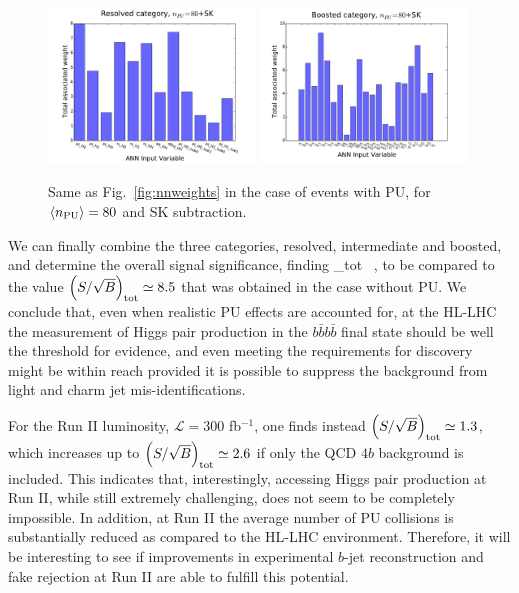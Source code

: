\begin{figure}[t]
\begin{center}
\includegraphics[width=0.49\textwidth]{plots/res_wgthist_SKPU80.pdf}
\includegraphics[width=0.49\textwidth]{plots/bst_wgthist_SKPU80.pdf}
\vspace{-0.5cm}
\caption{\small
Same as Fig.~\ref{fig:nnweights} in the
case of events with PU, for
 $\left\langle n_{\rm PU}\right\rangle=80$ 
  and SK subtraction.
}
\label{fig:nnweights_PU}
\end{center}
\end{figure}

We can finally combine the three categories, resolved,
intermediate and boosted, and determine the overall signal
significance, finding
\be
\lp {}\rp_{\rm tot}  \, ,
\ee
to be compared to the value $\left( S/\sqrt{B}\right)_{\rm tot} \simeq 8.5$
that was obtained in the case without PU.
%
We conclude that, even when realistic PU effects are accounted
for, at the HL-LHC the measurement of
Higgs pair production in the $b\bar{b}b\bar{b}$ final state should be 
well the threshold for evidence, and even meeting the
requirements for discovery might be within reach provided it is possible
to suppress the background from light and charm jet mis-identifications.


For the Run II luminosity, $\mathcal{L}=300$ fb$^{-1}$, one finds
instead $\left( S/\sqrt{B}\right)_{\rm tot} \simeq 1.3$, which increases up to
$\left( S/\sqrt{B}\right)_{\rm tot} \simeq 2.6$ if only the QCD $4b$ background is included.
%
This indicates that, interestingly, accessing Higgs pair production at Run II,
while still extremely challenging, does not seem to be completely impossible.
%
In addition, at Run II the average number of PU collisions is substantially
reduced as compared to the HL-LHC environment.
%
Therefore, it will be interesting to see if improvements in experimental $b$-jet
reconstruction and fake rejection at Run II are able to fulfill this
potential.

